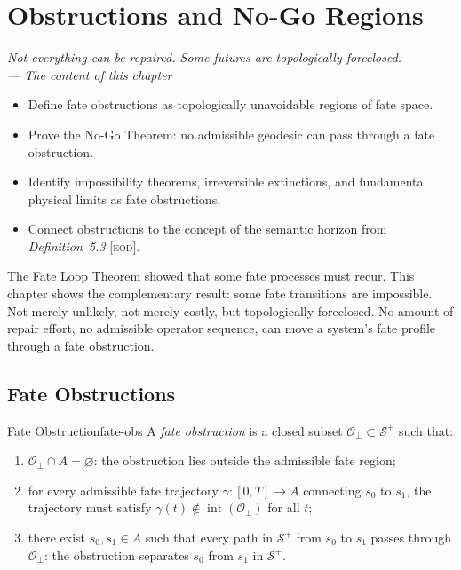 \documentclass[12pt,twoside,openright]{book}
\newcommand{\fateSpace}{\mathcal{S}}
\newcommand{\EOD}[1]{\textit{#1} [\textsc{eod}]}
\newcommand{\admRegion}{A}
\newenvironment{epigraph}[2]{%
  \vspace{1em}\begin{flushright}
  \begin{minipage}{0.72\textwidth}
  \itshape\small #1\\[0.4em]
  \upshape\footnotesize\sffamily\color{DistGray}--- #2
  \end{minipage}\end{flushright}\vspace{1.5em}}{}
\newenvironment{objectives}{%
  \begin{tcolorbox}[colback=DistBlue!5,colframe=DistBlue,
    title={\faCheckCircle\enspace Chapter Objectives},
    fonttitle=\sffamily\bfseries\color{white},
    attach boxed title to top left={yshift=-2mm,xshift=4mm},
    boxed title style={colback=DistBlue},breakable]
  \begin{itemize}[leftmargin=*,nosep]}{%
  \end{itemize}\end{tcolorbox}\vspace{1em}}
\providecommand{\fatePos}{\fateSpace^{+}}
\providecommand{\admRegion}{A}
\providecommand{\fateTraj}{\gamma}
\providecommand{\obstSet}{\mathcal{O}_{\perp}}
\begin{document}

\chapter{Obstructions and No-Go Regions}
\label{ch:obstructions}

\begin{epigraph}{Not everything can be repaired. Some futures
  are topologically foreclosed.}{The content of this chapter}
\end{epigraph}

\begin{objectives}
\item Define fate obstructions as topologically unavoidable
  regions of fate space.
\item Prove the No-Go Theorem: no admissible geodesic can pass
  through a fate obstruction.
\item Identify impossibility theorems, irreversible extinctions,
  and fundamental physical limits as fate obstructions.
\item Connect obstructions to the concept of the semantic
  horizon from \EOD{Definition~5.3}.
\end{objectives}

The Fate Loop Theorem showed that some fate processes must
recur. This chapter shows the complementary result: some
fate transitions are impossible. Not merely unlikely, not merely
costly, but topologically foreclosed. No amount of repair
effort, no admissible operator sequence, can move a system's
fate profile through a fate obstruction.

\section{Fate Obstructions}

\begin{definition}{Fate Obstruction}{fate-obs}
A \emph{fate obstruction} is a closed subset
$\obstSet\subset\fatePos$ such that:
\begin{enumerate}[nosep,label=(\roman*)]
  \item $\obstSet\cap\admRegion=\varnothing$: the obstruction
    lies outside the admissible fate region;
  \item for every admissible fate trajectory
    $\fateTraj:[0,T]\to\admRegion$ connecting $s_0$ to $s_1$,
    the trajectory must satisfy
    $\fateTraj(t)\notin\operatorname{int}(\obstSet)$ for all $t$;
  \item there exist $s_0,s_1\in\admRegion$ such that every
    path in $\fatePos$ from $s_0$ to $s_1$ passes through
    $\obstSet$: the obstruction separates $s_0$ from $s_1$ in
    $\fatePos$.
\end{enumerate}
\end{definition}
\end{document}
